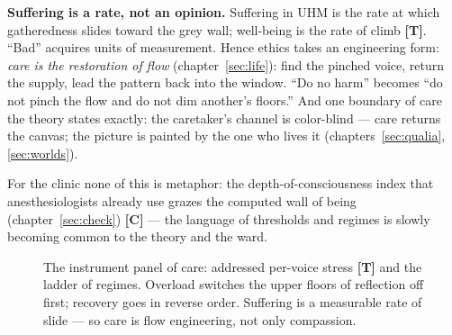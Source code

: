 \documentclass[11pt,letterpaper]{article}
\newcommand{\stT}{\textbf{[T]}\xspace}
\newcommand{\stC}{\textbf{[C]}\xspace}
\begin{document}
\textbf{Suffering is a rate, not an opinion.} Suffering in UHM is
the rate at which gatheredness slides toward the grey wall;
well-being is the rate of climb \stT. ``Bad'' acquires units of
measurement. Hence ethics takes an engineering form: \emph{care is
the restoration of flow} (chapter~\ref{sec:life}): find the pinched
voice, return the supply, lead the pattern back into the window.
``Do no harm'' becomes ``do not pinch the flow and do not dim
another's floors.'' And one boundary of care the theory states
exactly: the caretaker's channel is color-blind --- care returns
the canvas; the picture is painted by the one who lives it
(chapters~\ref{sec:qualia}, \ref{sec:worlds}).

For the clinic none of this is metaphor: the depth-of-consciousness
index that anesthesiologists already use grazes the computed wall
of being (chapter~\ref{sec:check}) \stC{} --- the language of
thresholds and regimes is slowly becoming common to the theory and
the ward.

\begin{figure}[H]
\centering
{}
\caption{The instrument panel of care: addressed per-voice stress
\stT{} and the ladder of regimes. Overload switches the upper
floors of reflection off first; recovery goes in reverse order.
Suffering is a measurable rate of slide --- so care is flow
engineering, not only compassion.}
\label{fig:gauge}
\end{figure}
\end{document}
